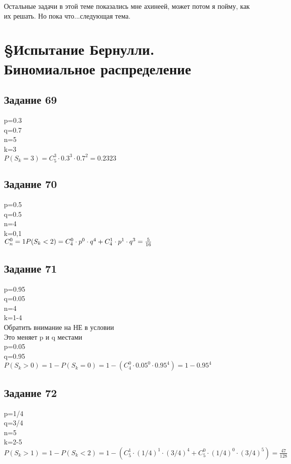 \documentclass[12pt]{article}
\begin{document}
Остальные задачи в этой теме показались мне ахинеей, может потом я пойму, как их решать. Но пока что...следующая тема.

\newpage
\section{\S Испытание Бернулли. Биномиальное распределение}

\subsection{Задание 69}
p=0.3\\
q=0.7\\
n=5\\
k=3\\
$
P(S_k=3)=C_{5}^{3}\cdot 0.3^3\cdot 0.7^2 = 0.2323 
$
\newpage
\subsection{Задание 70}
p=0.5\\
q=0.5\\
n=4\\
k=0,1\\
$
C_{n}^{0} = 1\\
P(S_k<2)=C_{4}^{0}\cdot p^0\cdot q^4 + C_{4}^{1}\cdot p^1\cdot q^3 =  \frac{5}{16} 
$
\newpage
\subsection{Задание 71} 
p=0.95\\
q=0.05\\
n=4\\
k=1-4\\
Обратить внимание на НЕ в условии\\
Это меняет p и q  местами\\
p=0.05\\
q=0.95\\
$
P(S_k>0)=1-P(S_k=0)=1-(C_{4}^{0}\cdot 0.05^0 \cdot 0.95^4) = 1-  0.95^4 
$
\newpage
\subsection{Задание 72}
p=1/4\\
q=3/4\\
n=5\\
k=2-5\\
$
P(S_k>1)=1-P(S_k<2)=1-(C_{5}^{1}\cdot (1/4)^1\cdot (3/4)^4 + C_{5}^{0}\cdot (1/4)^0\cdot (3/4)^5) =  \frac{47}{128} 
$
\newpage
\end{document}
